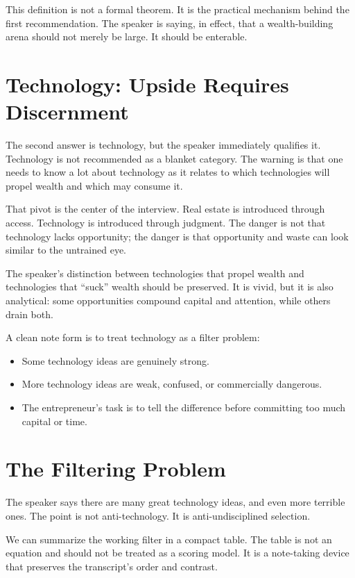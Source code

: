 This definition is not a formal theorem. It is the practical mechanism behind the first recommendation. The speaker is saying, in effect, that a wealth-building arena should not merely be large. It should be enterable.

\section{Technology: Upside Requires Discernment}

The second answer is technology, but the speaker immediately qualifies it. Technology is not recommended as a blanket category. The warning is that one needs to know a lot about technology as it relates to which technologies will propel wealth and which may consume it.

That pivot is the center of the interview. Real estate is introduced through access. Technology is introduced through judgment. The danger is not that technology lacks opportunity; the danger is that opportunity and waste can look similar to the untrained eye.

\begin{remark}
The speaker's distinction between technologies that propel wealth and technologies that ``suck'' wealth should be preserved. It is vivid, but it is also analytical: some opportunities compound capital and attention, while others drain both.
\end{remark}

A clean note form is to treat technology as a filter problem:

\begin{itemize}
\item Some technology ideas are genuinely strong.
\item More technology ideas are weak, confused, or commercially dangerous.
\item The entrepreneur's task is to tell the difference before committing too much capital or time.
\end{itemize}

\section{The Filtering Problem}

The speaker says there are many great technology ideas, and even more terrible ones. The point is not anti-technology. It is anti-undisciplined selection.

We can summarize the working filter in a compact table. The table is not an equation and should not be treated as a scoring model. It is a note-taking device that preserves the transcript's order and contrast.

